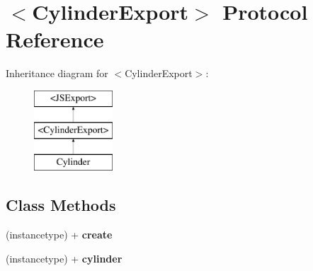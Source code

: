 \hypertarget{protocol_cylinder_export-p}{}\section{$<$Cylinder\+Export$>$ Protocol Reference}
\label{protocol_cylinder_export-p}
Inheritance diagram for $<$Cylinder\+Export$>$\+:\begin{figure}[H]
\begin{center}
\leavevmode
\includegraphics[height=3.000000cm]{protocol_cylinder_export-p}
\end{center}
\end{figure}
\subsection*{Class Methods}
\begin{DoxyCompactItemize}
\item 
\hypertarget{protocol_cylinder_export-p_a23d0543cd79f7c0ff095d75dda0dda1f}{}(instancetype) + {\bfseries create}\label{protocol_cylinder_export-p_a23d0543cd79f7c0ff095d75dda0dda1f}

\item 
\hypertarget{protocol_cylinder_export-p_a522f6a6f3c1ae9295f82378c38e842bb}{}(instancetype) + {\bfseries cylinder}\label{protocol_cylinder_export-p_a522f6a6f3c1ae9295f82378c38e842bb}

\end{DoxyCompactItemize}
